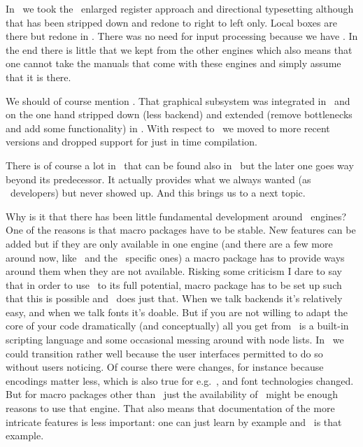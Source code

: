 In \LUATEX\ we took the \OMEGA\ enlarged register approach and directional
typesetting although that has been stripped down and redone to right to left
only. Local boxes are there but redone in \LUAMETATEX. There was no need for
input processing because we have \LUA. In the end there is little that we kept
from the other engines which also means that one cannot take the manuals that
come with these engines and simply assume that it is there.

We should of course mention \METAPOST. That graphical subsystem was integrated in
\LUATEX\ and on the one hand stripped down (less backend) and extended (remove
bottlenecks and add some functionality) in \LUAMETATEX. With respect to \LUA\
we moved to more recent versions and dropped support for just in time compilation.

There is of course a lot in \LUATEX\ that can be found also in \LUAMETATEX\ but
the later one goes way beyond its predecessor. It actually provides what we always
wanted (as \CONTEXT\ developers) but never showed up. And this brings us to a next
topic.

\stopsection

\startsection[title=Usage]

Why is it that there has been little fundamental development around \TEX\
engines? One of the reasons is that macro packages have to be stable. New
features can be added but if they are only available in one engine (and there are
a few more around now, like \XETEX\ and the \CJK\ specific ones) a macro package
has to provide ways around them when they are not available. Risking some
criticism I dare to say that in order to use \LUATEX\ to its full potential,
macro package has to be set up such that this is possible and \CONTEXT\ does just
that. When we talk backends it's relatively easy, and when we talk fonts it's
doable. But if you are not willing to adapt the core of your code dramatically
(and conceptually) all you get from \LUATEX\ is a built-in scripting language and
some occasional messing around with node lists. In \CONTEXT\ we could transition
rather well because the user interfaces permitted to do so without users
noticing. Of course there were changes, for instance because encodings matter
less, which is also true for e.g.\ \XETEX, and font technologies changed. But for
macro packages other than \CONTEXT\ just the availability of \LUA\ might be
enough reasons to use that engine. That also means that documentation of the more
intricate features is less important: one can just learn by example and \CONTEXT\
is that example.

